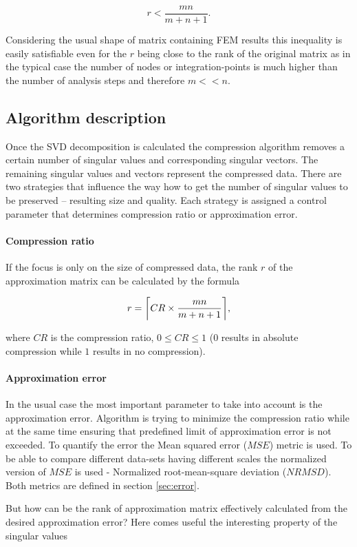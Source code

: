$$r<\frac{m n}{m+n+1}.$$

Considering the usual shape of matrix containing FEM results this inequality is easily satisfiable even for the $r$ being close to the rank of the original matrix as in the typical case the number of nodes or integration-points is much higher than the number of analysis steps and therefore $m<<n$.

\subsection{Algorithm description}
Once the SVD decomposition is calculated the compression algorithm removes a certain number of singular values and corresponding singular vectors. The remaining singular values and vectors represent the compressed data. There are two strategies that influence the way how to get the number of singular values to be preserved -- resulting size and quality. Each strategy is assigned a control parameter that determines compression ratio or approximation error.

\paragraph{Compression ratio}
If the focus is only on the size of compressed data, the rank $r$ of the approximation matrix can be calculated by the formula

\begin{equation}
r=\ceil*{CR \times \frac{m n}{m+n+1}},
\end{equation}

where $CR$ is the compression ratio, $0 \leq CR \leq 1$ ($0$ results in absolute compression while $1$ results in no compression).

\paragraph{Approximation error}
In the usual case the most important parameter to take into account is the approximation error. Algorithm is trying to minimize the compression ratio while at the same time ensuring that predefined limit of approximation error is not exceeded. To quantify the error the Mean squared error ($MSE$) metric is used. To be able to compare different data-sets having different scales the normalized version of $MSE$ is used - Normalized root-mean-square deviation ($NRMSD$). Both metrics are defined in section \ref{sec:error}.

But how can be the rank of approximation matrix effectively calculated from the desired approximation error? Here comes useful the interesting property of the singular values

